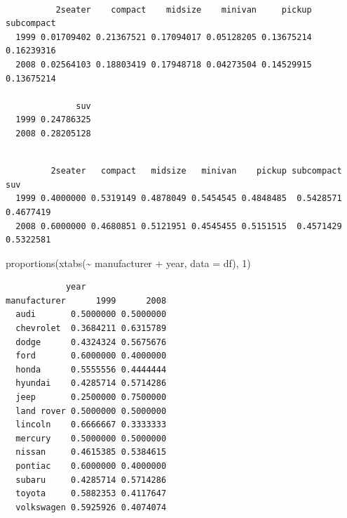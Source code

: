 \documentclass[
  letterpaper,
  DIV=11,
  numbers=noendperiod]{scrreprt}
\newenvironment{Shaded}{\begin{snugshade}}{\end{snugshade}}
\newcommand{\AttributeTok}[1]{\textcolor[rgb]{0.40,0.45,0.13}{#1}}
\newcommand{\CommentTok}[1]{\textcolor[rgb]{0.37,0.37,0.37}{#1}}
\newcommand{\DecValTok}[1]{\textcolor[rgb]{0.68,0.00,0.00}{#1}}
\newcommand{\FunctionTok}[1]{\textcolor[rgb]{0.28,0.35,0.67}{#1}}
\newcommand{\NormalTok}[1]{\textcolor[rgb]{0.00,0.23,0.31}{#1}}
\newcommand{\SpecialCharTok}[1]{\textcolor[rgb]{0.37,0.37,0.37}{#1}}
\begin{document}
\begin{Shaded}
\end{Shaded}

\begin{verbatim}
      
          2seater    compact    midsize    minivan     pickup subcompact
  1999 0.01709402 0.21367521 0.17094017 0.05128205 0.13675214 0.16239316
  2008 0.02564103 0.18803419 0.17948718 0.04273504 0.14529915 0.13675214
      
              suv
  1999 0.24786325
  2008 0.28205128
\end{verbatim}

\begin{Shaded}
\end{Shaded}

\begin{verbatim}
      
         2seater   compact   midsize   minivan    pickup subcompact       suv
  1999 0.4000000 0.5319149 0.4878049 0.5454545 0.4848485  0.5428571 0.4677419
  2008 0.6000000 0.4680851 0.5121951 0.4545455 0.5151515  0.4571429 0.5322581
\end{verbatim}

\begin{Shaded}
\begin{Highlighting}[]
\FunctionTok{proportions}\NormalTok{(}\FunctionTok{xtabs}\NormalTok{(}\SpecialCharTok{\textasciitilde{}}\NormalTok{ manufacturer }\SpecialCharTok{+}\NormalTok{ year, }\AttributeTok{data =}\NormalTok{ df), }\DecValTok{1}\NormalTok{)}
\end{Highlighting}
\end{Shaded}

\begin{verbatim}
            year
manufacturer      1999      2008
  audi       0.5000000 0.5000000
  chevrolet  0.3684211 0.6315789
  dodge      0.4324324 0.5675676
  ford       0.6000000 0.4000000
  honda      0.5555556 0.4444444
  hyundai    0.4285714 0.5714286
  jeep       0.2500000 0.7500000
  land rover 0.5000000 0.5000000
  lincoln    0.6666667 0.3333333
  mercury    0.5000000 0.5000000
  nissan     0.4615385 0.5384615
  pontiac    0.6000000 0.4000000
  subaru     0.4285714 0.5714286
  toyota     0.5882353 0.4117647
  volkswagen 0.5925926 0.4074074
\end{verbatim}
\end{document}
